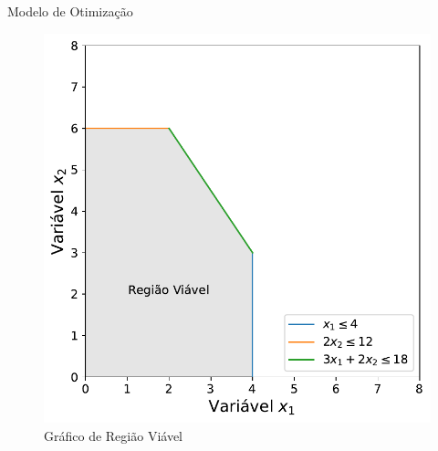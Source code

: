 \documentclass{if-beamer}
\begin{document}
\begin{frame}{Modelo de Otimização}
\begin{minipage}{.49\textwidth}
\begin{figure}
    \centering
    \includegraphics[scale=.45]{figuras/fig_wyndor.pdf}
    \caption{Gráfico de Região Viável}
\end{figure}

\end{minipage}

\end{frame}

\end{document}
